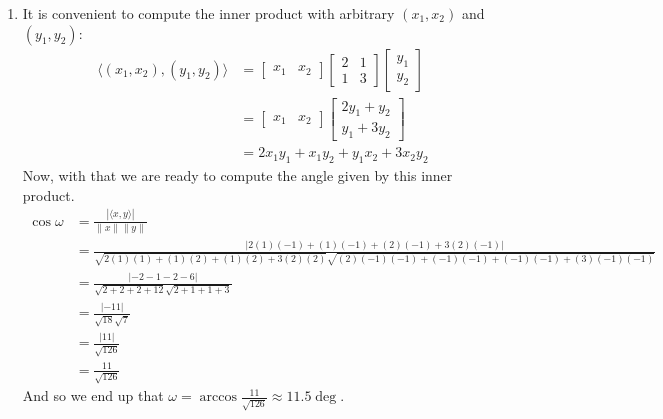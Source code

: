 \documentclass[final,expand]{problemset}
\begin{document}
{\begin{enumerate}
		\item It is convenient to compute the inner product with arbitrary $(x_1, x_2)$ and $(y_1, y_2)$:
		\begin{align*}
			\langle (x_1, x_2), (y_1, y_2)\rangle &= \begin{bmatrix}
				x_1 & x_2
			\end{bmatrix} \begin{bmatrix}
				2 & 1\\ 1 & 3
			\end{bmatrix} \begin{bmatrix}
				y_1 \\ y_2
			\end{bmatrix}\\
			&= \begin{bmatrix}
				x_1 & x_2
			\end{bmatrix}\begin{bmatrix}
				2y_1 + y_2\\
				y_1 + 3y_2
			\end{bmatrix}\\
			&= 2x_1y_1 + x_1y_2 + y_1x_2 + 3x_2y_2
		\end{align*}
		Now, with that we are ready to compute the angle given by this inner product.
		\begin{align*}
			\cos \omega &= \frac{|\langle x, y\rangle|}{\|x\| \|y\|}\\
			&= \frac{|2(1)(-1) + (1)(-1) + (2)(-1) + 3(2)(-1)|}{\sqrt{2(1)(1) + (1)(2) + (1)(2) + 3(2)(2)} \sqrt{(2)(-1)(-1) + (-1)(-1) + (-1)(-1) + (3)(-1)(-1)}}\\
			&= \frac{|-2-1-2-6|}{\sqrt{2+2+2+12} \sqrt{2+1+1+3}}\\
			&= \frac{|-11|}{\sqrt{18} \sqrt{7}}\\
			&= \frac{|11|}{\sqrt{126}}\\
			&= \frac{11}{\sqrt{126}}
		\end{align*}
		And so we end up that $\omega = \arccos \frac{11}{\sqrt{126}} \approx 11.5 \deg$.
	\end{enumerate}
}
\end{document}
